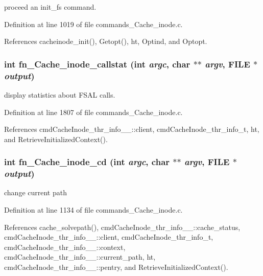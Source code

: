 proceed an init\_\-fs command. 

Definition at line 1019 of file commands\_\-Cache\_\-inode.c.

References cacheinode\_\-init(), Getopt(), ht, Optind, and Optopt.
\subsubsection{\setlength{\rightskip}{0pt plus 5cm}int fn\_\-Cache\_\-inode\_\-callstat (int {\em argc}, char $\ast$$\ast$ {\em argv}, FILE $\ast$ {\em output})}\label{commands__Cache__inode_8c_a34}


display statistics about FSAL calls. 

Definition at line 1807 of file commands\_\-Cache\_\-inode.c.

References cmd\-Cache\-Inode\_\-thr\_\-info\_\-\_\-::client, cmd\-Cache\-Inode\_\-thr\_\-info\_\-t, ht, and Retrieve\-Initialized\-Context().
\subsubsection{\setlength{\rightskip}{0pt plus 5cm}int fn\_\-Cache\_\-inode\_\-cd (int {\em argc}, char $\ast$$\ast$ {\em argv}, FILE $\ast$ {\em output})}\label{commands__Cache__inode_8c_a30}


change current path 

Definition at line 1134 of file commands\_\-Cache\_\-inode.c.

References cache\_\-solvepath(), cmd\-Cache\-Inode\_\-thr\_\-info\_\-\_\-::cache\_\-status, cmd\-Cache\-Inode\_\-thr\_\-info\_\-\_\-::client, cmd\-Cache\-Inode\_\-thr\_\-info\_\-t, cmd\-Cache\-Inode\_\-thr\_\-info\_\-\_\-::context, cmd\-Cache\-Inode\_\-thr\_\-info\_\-\_\-::current\_\-path, ht, cmd\-Cache\-Inode\_\-thr\_\-info\_\-\_\-::pentry, and Retrieve\-Initialized\-Context().
